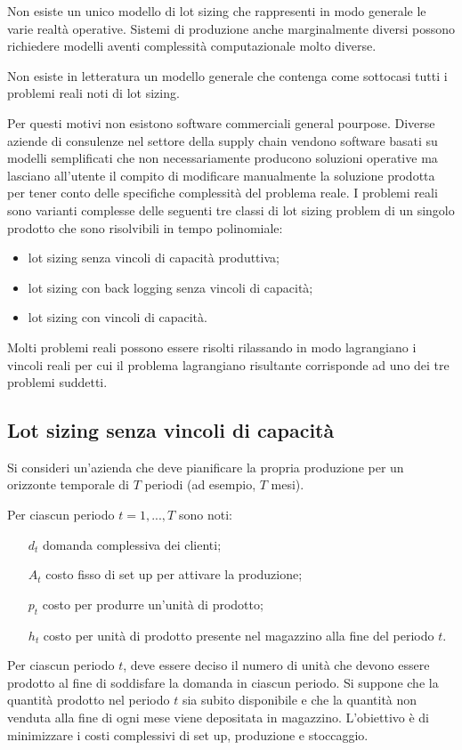 Non esiste un unico modello di lot sizing che rappresenti in modo generale le varie realtà operative. Sistemi di produzione anche marginalmente diversi possono richiedere modelli aventi complessità computazionale molto diverse.

Non esiste in letteratura un modello generale che contenga come sottocasi tutti i problemi reali noti di lot sizing.

Per questi motivi non esistono software commerciali general pourpose.\newline
Diverse aziende di consulenze nel settore della supply chain vendono software basati su modelli semplificati che non necessariamente producono soluzioni operative ma lasciano all'utente il compito di modificare manualmente la soluzione prodotta per tener conto delle specifiche complessità del problema reale.\newline
I problemi reali sono varianti complesse delle seguenti tre classi di lot sizing problem di un singolo prodotto che sono risolvibili in tempo polinomiale:
\begin{itemize}
	\item lot sizing senza vincoli di capacità produttiva;
	\item lot sizing con back logging senza vincoli di capacità;
	\item lot sizing con vincoli di capacità.
\end{itemize}
Molti problemi reali possono essere risolti rilassando in modo lagrangiano i vincoli reali per cui il problema lagrangiano risultante corrisponde ad uno dei tre problemi suddetti.

\subsection{Lot sizing senza vincoli di capacit\`a}
Si consideri un'azienda che deve pianificare la propria produzione per un orizzonte temporale di $T$ periodi (ad esempio, $T$ mesi).

Per ciascun periodo $t=1,...,T$ sono noti:
\begin{itemize}
	\item[\textit{$d_{t}$}] domanda complessiva dei clienti;
	\item[\textit{$A_{t}$}] costo fisso di set up per attivare la produzione;
	\item[\textit{$p_{t}$}] costo per produrre un'unità di prodotto;
	\item[\textit{$h_{t}$}] costo per unità di prodotto presente nel magazzino alla fine del periodo $t$. 
\end{itemize}
Per ciascun periodo $t$, deve essere deciso il numero di unità che devono essere prodotto al fine di soddisfare la domanda in ciascun periodo.\newline
Si suppone che la quantità prodotto nel periodo $t$ sia subito disponibile e che la quantità non venduta alla fine di ogni mese viene depositata in magazzino.
L'obiettivo è di minimizzare i costi complessivi di set up, produzione e stoccaggio.

